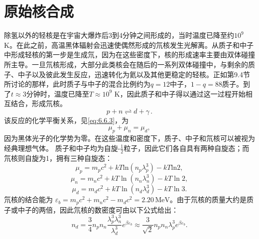 \section{原始核合成}\label{ux539fux59cbux6838ux5408ux6210}
除氢以外的轻核是在宇宙大爆炸后3到4分钟之间形成的，当时温度已降至约\(10^{9}\) K。在此之前，高温黑体辐射会迅速使偶然形成的氘核发生光解离。从质子和中子中形成轻核的第一步是生成氘，因为在这些密度下，核的形成速率主要由双体碰撞所主导。一旦氘核形成，大部分此类核会在随后的一系列双体碰撞中，与剩余的质子、中子以及彼此发生反应，迅速转化为氦以及其他更稳定的轻核。正如第9.4节所讨论的那样，此时质子与中子的混合比例约为\(q=12%
\)中子，\(1-q=88%
\)质子。到了\(t\approx3\)分钟时，温度已降至\(T\approx10^{9}\) K，因此质子和中子得以通过这一过程开始相互结合，形成氘核。
\begin{equation}\tag{9.7.1}\label{eq:9.7.1}
p + n \rightleftharpoons d + \gamma \, .
\end{equation}
该反应的化学平衡关系，见\autoref{eq:6.6.3}，为
\begin{equation}\tag{9.7.2}\label{eq:9.7.2}
\mu _ { p } + \mu _ { n } = \mu _ { d } ,
\end{equation}
因为黑体光子的化学势为零。在这些温度和密度下，质子、中子和氘核可以被视为经典理想气体。
质子和中子均为自旋-\(\frac{1}{2}\)粒子，因此它们各自具有两种自旋态；而氘核则自旋为1，拥有三种自旋态：
\begin{equation}\tag{9.7.3}\label{eq:9.7.3}
\mu _ { p } = m _ { p } c ^{2} + k T \mathrm { l n } \left( n _ { p } \lambda _ { p } ^{3} \right) - k T \mathrm { l n } 2 ,
\end{equation}
\begin{equation}\tag{9.7.4}\label{eq:9.7.4}
\mu _ { n } = m _ { n } c ^{2} + k T \ln \left( n _ { n } \lambda _ { n } ^{3} \right) - k T \ln 2 ,
\end{equation}
\begin{equation}\tag{9.7.5}\label{eq:9.7.5}
\mu _ { d } = m _ { d } c ^{2} + k T \ln \left( n _ { d } \lambda _ { d } ^{3} \right) - k T \ln 3 .
\end{equation}
氘核的结合能为 \(\varepsilon_{b}=m_{p}c^{2}+m_{n}c^{2}-m_{d}c^{2}=2.20\,\mathrm{MeV}\)。由于氘核的质量大约是质子或中子的两倍，因此氘核的数密度可由以下公式给出：
\begin{equation}\tag{9.7.6}\label{eq:9.7.6}
n _ { d } = \frac { 3 } { 4 } n _ { p } n _ { n } \frac { \lambda _ { p } ^{3} \lambda _ { n } ^{3} } { \lambda _ { d } ^{3} } e ^{\beta \varepsilon _ { b} } \approx \frac { 3 } { \sqrt { 2 } } n _ { p } n _ { n } \lambda _ { p } ^{3} e ^{\beta \varepsilon _ { b} } .
\end{equation}
